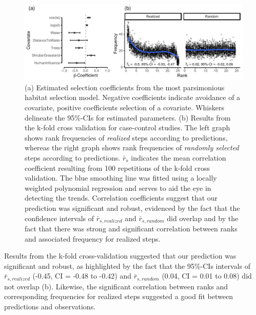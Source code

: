 \documentclass[abstract=on,10pt,a4paper,bibliography=totocnumbered]{scrartcl}
\begin{document}
\begin{figure}[h]
  \begin{center}
    \includegraphics[width = \textwidth]{99_PermeabilityResults.pdf}
    \caption{(a) Estimated selection coefficients from the most parsimonious
    habitat selection model. Negative coefficients indicate avoidance of a
    covariate, positive coefficients selection of a covariate. Whiskers
    delineate the 95\%-CIs for estimated parameters. (b) Results from the k-fold
    cross validation for case-control studies. The left graph shows rank
    frequencies of \textit{realized} steps according to predictions, whereas the
    right graph shows rank frequencies of \textit{randomly selected} steps
    according to predictions. \(\bar{r}_s\) indicates the mean correlation
    coefficient resulting from 100 repetitions of the k-fold cross validation.
    The blue smoothing line was fitted using a locally weighted polynomial
    regression and serves to aid the eye in detecting the trends. Correlation
    coefficients suggest that our prediction was significant and robust,
    evidenced by the fact that the confidence intervals of \(\bar{r}_{s,
    realized}\) and \(\bar{r}_{s, random}\) did overlap and by the fact that
    there was strong and significant correlation between ranks and associated
    frequency for realized steps.}
    \label{PermeabilityResults}
  \end{center}
\end{figure}

\newpage
\noindent Results from the k-fold cross-validation suggested that our prediction
was significant and robust, as highlighted by the fact that the 95\%-CIs
intervals of \(\bar{r}_{s, realized}\) (-0.45, CI = -0.48 to -0.42) and
\(\bar{r}_{s, random}\) (0.04, CI = 0.01 to 0.08) did not overlap
(b). Likewise, the significant correlation between
ranks and corresponding frequencies for realized steps suggested a good fit
between predictions and observations.
\end{document}
